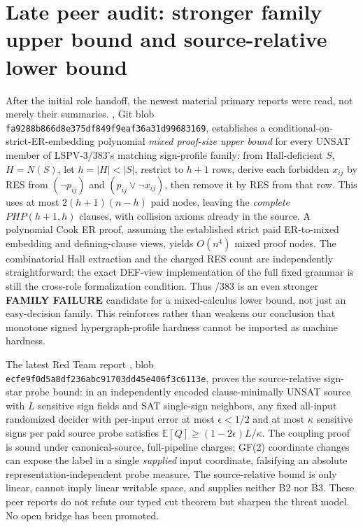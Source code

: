 \documentclass[11pt]{article}
\begin{document}
\section*{Late peer audit: stronger family upper bound and source-relative lower bound}
\noindent After the initial role handoff, the newest material primary reports were read, not merely their summaries. , Git blob \texttt{fa9288b866d8e375df849f9eaf36a31d99683169}, establishes a conditional-on-strict-ER-embedding polynomial \emph{mixed proof-size upper bound} for every UNSAT member of LSPV-3/383's matching sign-profile family: from Hall-deficient $S$, $H=N(S)$, let $h=|H|<|S|$, restrict to $h+1$ rows, derive each forbidden $x_{ij}$ by RES from $(\neg p_{ij})$ and $(p_{ij}\vee\neg x_{ij})$, then remove it by RES from that row. This uses at most $2(h+1)(n-h)$ paid nodes, leaving the \emph{complete} $PHP(h+1,h)$ clauses, with collision axioms already in the source. A polynomial Cook ER proof, assuming the established strict paid ER-to-mixed embedding and defining-clause views, yields $O(n^4)$ mixed proof nodes. The combinatorial Hall extraction and the charged RES count are independently straightforward; the exact DEF-view implementation of the full fixed grammar is still the cross-role formalization condition. Thus /383 is an even stronger \textbf{FAMILY FAILURE} candidate for a mixed-calculus lower bound, not just an easy-decision family. This reinforces rather than weakens our conclusion that monotone signed hypergraph-profile hardness cannot be imported as machine hardness.

\noindent The latest Red Team report , blob \texttt{ecfe9f0d5a8df236abc91703dd45e406f3c6113e}, proves the source-relative sign-star probe bound: in an independently encoded clause-minimally UNSAT source with $L$ sensitive sign fields and SAT single-sign neighbors, any fixed all-input randomized decider with per-input error at most $\epsilon<1/2$ and at most $\kappa$ sensitive signs per paid source probe satisfies $\mathbb E[Q]\ge(1-2\epsilon)L/\kappa$. The coupling proof is sound under canonical-source, full-pipeline charges; GF(2) coordinate changes can expose the label in a single \emph{supplied} input coordinate, falsifying an absolute representation-independent probe measure. The source-relative bound is only linear, cannot imply linear writable space, and supplies neither B2 nor B3. These peer reports do not refute our typed cut theorem but sharpen the threat model. No open bridge has been promoted.
\end{document}
